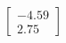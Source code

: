 \documentclass[preview]{standalone}
\begin{document}
\begin{align*}
\begin{bmatrix} -4.59 \\ 2.75 \end{bmatrix}
\end{align*}
\end{document}
